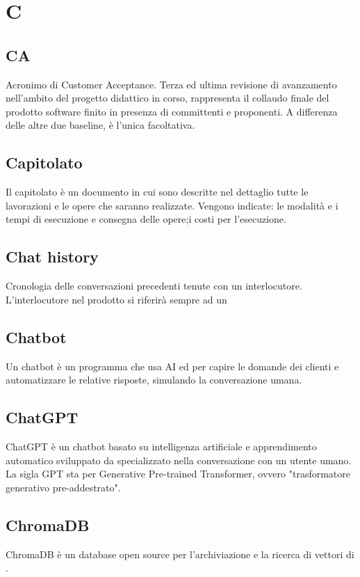 \chapter{C}

\section{CA}\label{sec:Customer Acceptance}
Acronimo di Customer Acceptance. Terza ed ultima revisione di avanzamento nell'ambito del progetto didattico in corso, rappresenta il collaudo finale del prodotto software finito in presenza di committenti e proponenti. A differenza delle altre due baseline, è l'unica facoltativa.

\section{Capitolato}\label{sec:Capitolati}
Il capitolato è un documento in cui sono descritte nel dettaglio tutte le lavorazioni e le opere che saranno realizzate. Vengono indicate: le modalità e i tempi di esecuzione e consegna delle opere;i costi per l'esecuzione.

\section{Chat history}
Cronologia delle conversazioni precedenti tenute con un interlocutore. L'interlocutore nel prodotto si riferirà sempre ad un 

\section{Chatbot}
Un chatbot è un programma che usa AI ed  per capire le domande dei clienti e automatizzare le relative risposte, simulando la conversazione umana.

\section{ChatGPT}
ChatGPT è un chatbot basato su intelligenza artificiale e apprendimento automatico sviluppato da  specializzato nella conversazione con un utente umano. La sigla GPT sta per Generative Pre-trained Transformer, ovvero "trasformatore generativo pre-addestrato". 

\section{ChromaDB}\label{sec:Chroma}
ChromaDB è un database open source per l'archiviazione e la ricerca di vettori di .

